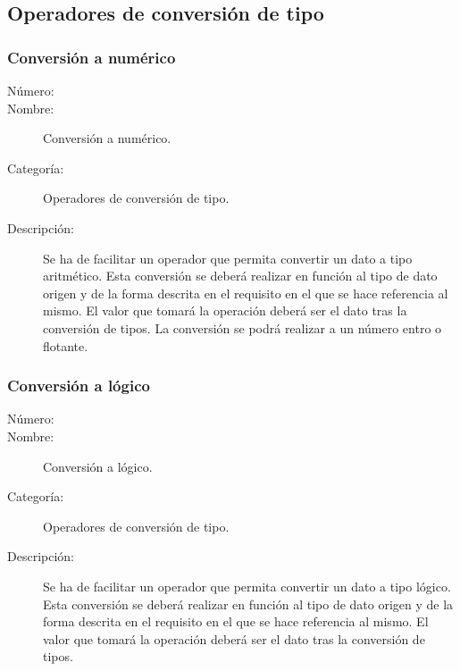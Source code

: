\subsection{Operadores de conversión de tipo}
\subsubsection{Conversión a numérico}
	\begin{description}
		\item [Número:] \cn
		\item [Nombre:] Conversión a numérico.
		\item [Categoría:] Operadores de conversión de tipo.
		\item [Descripción:] Se ha de facilitar un operador que permita convertir un dato a tipo aritmético. Esta conversión
		se deberá realizar en función al tipo de dato origen y de la forma descrita en el requisito en el que se hace referencia al mismo.
		El valor que tomará la operación deberá ser el dato tras la conversión de tipos. La conversión se podrá realizar a un número
      entro o flotante.
	\end {description}

\subsubsection{Conversión a lógico}
	\begin{description}
		\item [Número:] \cn
		\item [Nombre:] Conversión a lógico.
		\item [Categoría:] Operadores de conversión de tipo.
		\item [Descripción:] Se ha de facilitar un operador que permita convertir un dato a tipo lógico. Esta conversión
		se deberá realizar en función al tipo de dato origen y de la forma descrita en el requisito en el que se hace referencia al mismo.
		El valor que tomará la operación deberá ser el dato tras la conversión de tipos.
	\end {description}

